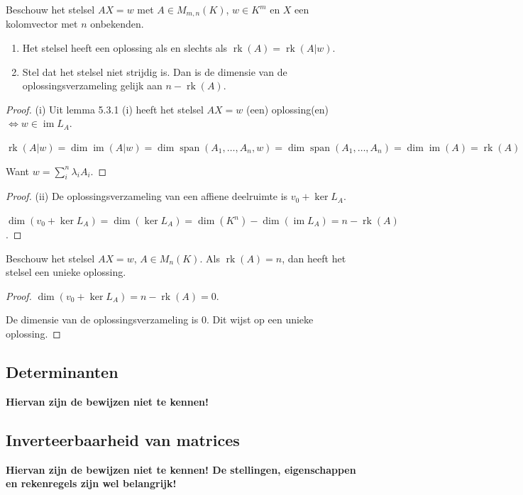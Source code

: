 \begin{stelling}[5.3.2]
    Beschouw het stelsel $AX = w$ met $A \in M_{m,n}(K)$, $w \in K^m$ en $X$ een kolomvector met $n$ onbekenden.
    \begin{enumerate}
        \item[(i)] Het stelsel heeft een oplossing als en slechts als $\operatorname{rk}(A) = \operatorname{rk}(A|w)$.
        \item[(ii)] Stel dat het stelsel niet strijdig is. Dan is de dimensie van de oplossingsverzameling gelijk aan $n - \operatorname{rk}(A)$.
    \end{enumerate}
\end{stelling}
\begin{proof}(i)
    Uit lemma 5.3.1 (i) heeft het stelsel \(AX = w\) (een) oplossing(en) \(\iff w \in \operatorname{im}L_A\).

    \(\operatorname{rk}(A|w)
    = \dim \operatorname{im}(A|w)
    = \dim \operatorname{span}(A_1,\dots,A_n,w)
    = \dim \operatorname{span}(A_1,\dots,A_n)
    = \dim \operatorname{im}(A)
    = \operatorname{rk}(A)
     \)

     Want \(w = \sum_{i}^{n}\lambda_i A_i\).
\end{proof}
\begin{proof}(ii)
    De oplossingsverzameling van een affiene deelruimte is \(v_0 + \ker L_A\).

    \(\dim(v_0 + \ker L_A) = \dim (\ker L_A) = \dim (K^n) - \dim(\operatorname{im}L_A) = n - \operatorname{rk}(A)\).
\end{proof}

\begin{gevolg}[5.3.3]
    Beschouw het stelsel $AX = w$, $A \in M_n(K)$. Als $\operatorname{rk}(A) = n$, dan heeft het stelsel een unieke oplossing.
\end{gevolg}
\begin{proof}
    \(\dim(v_0 + \ker L_A) = n - \operatorname{rk}(A) = 0\).

    De dimensie van de oplossingsverzameling is \(0\). Dit wijst op een unieke oplossing.
\end{proof}

\subsection{ Determinanten}
\textbf{Hiervan zijn de bewijzen niet te kennen!}
\subsection{Inverteerbaarheid van matrices}
\textbf{Hiervan zijn de bewijzen niet te kennen! De stellingen, eigenschappen en rekenregels zijn wel belangrijk!}
